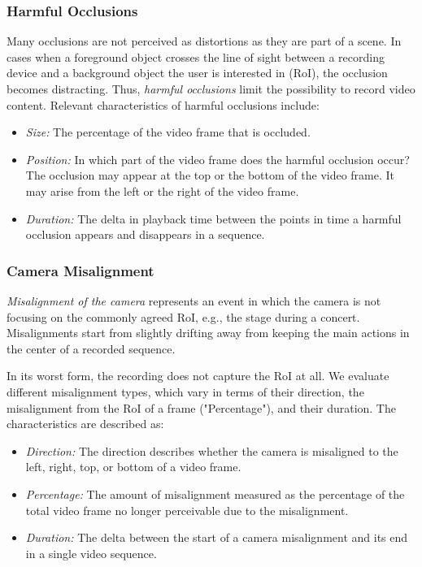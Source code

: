 \subsubsection{Harmful Occlusions}
Many occlusions are not perceived as distortions as they are part of a scene.
In cases when a foreground object crosses the line of sight between a recording device and a background object the user is interested in (\ac{RoI}), the occlusion becomes distracting. 
Thus, \emph{harmful occlusions} limit the possibility to record video content. 
Relevant characteristics of harmful occlusions include:
\begin{itemize}
	\item \emph{Size:} The percentage of the video frame that is occluded. 
	\item \emph{Position:} In which part of the video frame does the harmful occlusion occur? The occlusion may appear at the top or the bottom of the video frame.
	It may arise from the left or the right of the video frame. 
	\item \emph{Duration:} The delta in playback time between the points in time a harmful occlusion appears and disappears in a sequence.
\end{itemize}

\subsubsection{Camera Misalignment}
\emph{Misalignment of the camera} represents an event in which the camera is not focusing on the commonly agreed \ac{RoI}, e.g., the stage during a concert.
Misalignments start from slightly drifting away from keeping the main actions in the center of a recorded sequence.

In its worst form, the recording does not capture the \ac{RoI} at all. 
We evaluate different misalignment types, which vary in terms of their direction, the misalignment from the \ac{RoI} of a frame ("Percentage"), and their duration. 
The characteristics are described as:
\begin{itemize}
	\item \emph{Direction:} The direction describes whether the camera is misaligned to the left, right, top, or bottom of a video frame.
	\item \emph{Percentage:} The amount of misalignment measured as the percentage of the total video frame no longer perceivable due to the misalignment.
	\item \emph{Duration:} The delta between the start of a camera misalignment and its end in a single video sequence.
\end{itemize}
